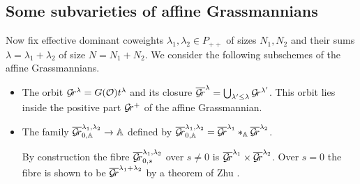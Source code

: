 \documentclass[draft]{article}
\begin{document}
\subsection{Some subvarieties of affine Grassmannians}
Now fix effective dominant coweights $\lambda_1, \lambda_2 \in P_{++}$ of sizes $N_1, N_2$  and their sums $ \lambda = \lambda_1 + \lambda_2 $ of size $ N = N_1 + N_2$. 
We consider the following subschemes of the affine Grassmannians.
% 
\begin{itemize}
    \item The orbit $\mathcal{G}\!r^\lambda = G(\mathcal O) t^\lambda$ and its closure 
    $ \overline{\mathcal{G}\!r}^\lambda = \bigcup_{\lambda' \le \lambda} \mathcal{G}\!r^{\lambda'} $.  
    This orbit lies inside the positive part $ \mathcal{G}\!r^+$ of the affine Grassmannian. 
    \item The family $ \overline{\mathcal{G}\!r}_{0,\mathbb A}^{\lambda_1, \lambda_2} \rightarrow \mathbb A$ defined by $ \overline{\mathcal{G}\!r}^{\lambda_1, \lambda_2}_{0, \mathbb A} = \overline{\mathcal{G}\!r}^{\lambda_1} \ast_\mathbb A \overline{\mathcal{G}\!r}^{\lambda_2}$. 
    
    By construction the fibre $ \overline{\mathcal{G}\!r}_{0,s}^{\lambda_1, \lambda_2} $ over $ s \ne 0 $ is $ \overline{\mathcal{G}\!r}^{\lambda_1} \times \overline{\mathcal{G}\!r}^{\lambda_2}$.  
    Over $s=0$ the fibre is shown to be $ \overline{\mathcal{G}\!r}^{\lambda_1 + \lambda_2}$ by a theorem of Zhu \cite[Proposition 3.1.14]{zhu2016introduction}. 


\end{itemize}
\end{document}
